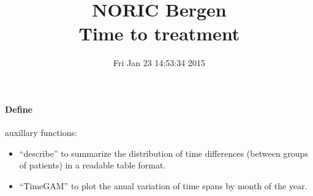 \documentclass[a4paper]{report}
\begin{document}
\title{}
\author{}
\date{}

\maketitle

\tableofcontents


\title{NORIC Bergen \\Time to treatment}\date{ Fri Jan 23 14:53:34 2015 }




\paragraph{Define} auxillary functions:
\begin{itemize}
  \item{``describe'' to summarize the distribution of time differences (between groups of patients) in a readable table format.}
  \item{``TimeGAM'' to plot the anual variation of time spans by month of the year.}
\end{itemize}
\end{document}
